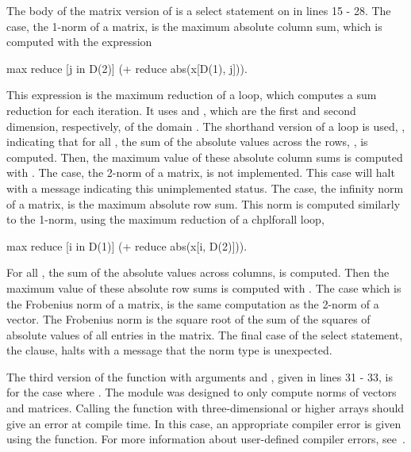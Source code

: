The body of the matrix version of 
is a select statement on  in lines 15 - 28.  The  case, 
the 1-norm of a matrix, is the maximum absolute column sum, which is computed 
with the expression 
\begin{chapel}
max reduce [j in D(2)] (+ reduce abs(x[D(1), j])).
\end{chapel}
This expression is the maximum reduction of a  loop, which computes
a sum reduction for each iteration.  
It uses  and , which are the first and second dimension,
respectively, of the domain .  The shorthand version of a 
loop is used, \chpl{[j in D(2)]}, indicating that
for all , the sum
of the absolute values across the rows, , is computed. 
Then, the maximum value of these  absolute column sums is computed with
.  The  case, the 2-norm of a matrix, is not
implemented.  This case will halt with a message indicating this unimplemented
status.  The  case, the infinity norm of a matrix, is the maximum
absolute row sum.  This norm is computed similarly to the 1-norm, using the maximum
reduction of a chpl{forall} loop, 
\begin{chapel}
max reduce [i in D(1)] (+ reduce abs(x[i, D(2)])).  
\end{chapel}
For all , the sum of the absolute values across columns,
 is computed.  Then the maximum value of these
 absolute row sums is computed with .  The 
case which is the Frobenius norm of a matrix, is the same computation as the
2-norm of a vector.  The Frobenius norm is the square root of the sum of the
squares of absolute values of all entries in the matrix.  The final case of
the select statement, the  clause, halts with a message that
the norm type is unexpected.

The third version of the  function with arguments 
and , given in lines 31 - 33, is for the case where .
The module was designed to only compute norms of vectors and matrices.  
Calling the  function with three-dimensional or higher arrays 
should give an error at compile time.  In this case, an appropriate compiler error 
is given using the  function.  For more information about 
user-defined compiler errors, see~.

